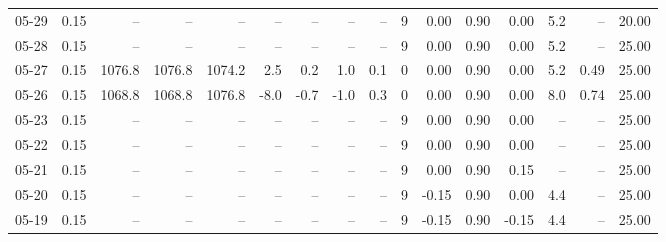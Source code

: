 \begin{threeparttable}
{\begin{tabular}{lrrrrrrrrrrrrrrr}
  05-29 &     0.15 &     -- &     -- &     -- &         -- &             -- &                       -- &                  -- &              9 &       0.00 &      0.90 &           0.00 &              5.2 &              -- &                  20.00 \\
  05-28 &     0.15 &     -- &     -- &     -- &         -- &             -- &                       -- &                  -- &              9 &       0.00 &      0.90 &           0.00 &              5.2 &              -- &                  25.00 \\
  05-27 &     0.15 & 1076.8 & 1076.8 & 1074.2 &        2.5 &            0.2 &                      1.0 &                 0.1 &              0 &       0.00 &      0.90 &           0.00 &              5.2 &            0.49 &                  25.00 \\
  05-26 &     0.15 & 1068.8 & 1068.8 & 1076.8 &       -8.0 &           -0.7 &                     -1.0 &                 0.3 &              0 &       0.00 &      0.90 &           0.00 &              8.0 &            0.74 &                  25.00 \\
  05-23 &     0.15 &     -- &     -- &     -- &         -- &             -- &                       -- &                  -- &              9 &       0.00 &      0.90 &           0.00 &               -- &              -- &                  25.00 \\
  05-22 &     0.15 &     -- &     -- &     -- &         -- &             -- &                       -- &                  -- &              9 &       0.00 &      0.90 &           0.00 &               -- &              -- &                  25.00 \\
  05-21 &     0.15 &     -- &     -- &     -- &         -- &             -- &                       -- &                  -- &              9 &       0.00 &      0.90 &           0.15 &               -- &              -- &                  25.00 \\
  05-20 &     0.15 &     -- &     -- &     -- &         -- &             -- &                       -- &                  -- &              9 &      -0.15 &      0.90 &           0.00 &              4.4 &              -- &                  25.00 \\
  05-19 &     0.15 &     -- &     -- &     -- &         -- &             -- &                       -- &                  -- &              9 &      -0.15 &      0.90 &          -0.15 &              4.4 &              -- &                  25.00 \\

\end{tabular}}
\end{threeparttable}
